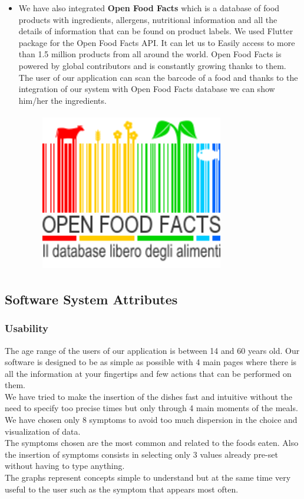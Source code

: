 \documentclass [12pt]{article}
\begin{document}
\begin{itemize}
To handle the authentication of external services (google, github and twitter) we also imported the firebase plugin: lit\textunderscore firebase\textunderscore auth: 0.3.0 
\\

\item We have also integrated  \textbf{Open Food Facts} which is a database of food products with ingredients, allergens, nutritional information and all the details of information that can be found on product labels.
We used Flutter package for the Open Food Facts API. It can let us to Easily access to more than 1.5 million products from all around the world. Open Food Facts is powered by global contributors and is constantly growing thanks to them.
The user of our application can scan the barcode of a food and thanks to the integration of our system with Open Food Facts database we can show him/her the ingredients.
\begin{figure}[ht!]
\centering
\includegraphics[height=7cm, width=8cm]{openfoodfacts.png}
\end{figure}

\end{itemize}


\subsection{Software System Attributes} 

\subsubsection{Usability}
The age range of the users of our application is between 14 and 60 years old.
Our software is designed to be as simple as possible with 4 main pages where there is all the information at your fingertips and few actions that can be performed on them.\\
We have tried to make the insertion of the dishes fast and intuitive without the need to specify too precise times but only through 4 main moments of the meals.
We have chosen only 8 symptoms to avoid too much dispersion in the choice and visualization of data.\\
The symptoms chosen are the most common and related to the foods eaten.
Also the insertion of symptoms consists in selecting only 3 values already pre-set without having to type anything.\\
The graphs represent concepts simple to understand but at the same time very useful to the user such as the symptom that appears most often.
\end{document}
